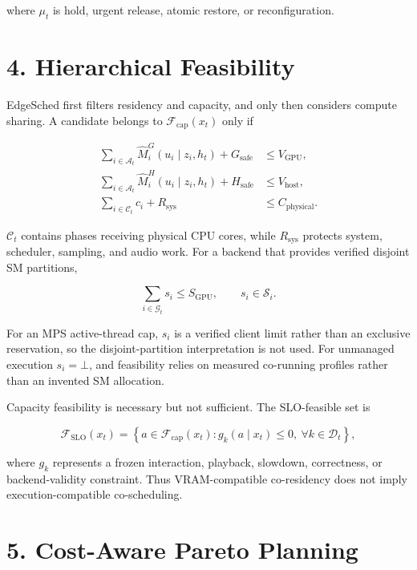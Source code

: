 \documentclass[10pt]{article}
\begin{document}
where $\mu_t$ is hold, urgent release, atomic restore, or reconfiguration.

\section*{4. Hierarchical Feasibility}

EdgeSched first filters residency and capacity, and only then considers compute
sharing.  A candidate belongs to $\mathcal F_{\mathrm{cap}}(x_t)$ only if

\begin{align}
\sum_{i\in\mathcal A_t}
  \widehat M_i^G(u_i\mid z_i,h_t)+G_{\mathrm{safe}}
  &\le V_{\mathrm{GPU}},\\
\sum_{i\in\mathcal A_t}
  \widehat M_i^H(u_i\mid z_i,h_t)+H_{\mathrm{safe}}
  &\le V_{\mathrm{host}},\\
\sum_{i\in\mathcal C_t}c_i+R_{\mathrm{sys}}
  &\le C_{\mathrm{physical}}.
\end{align}

$\mathcal C_t$ contains phases receiving physical CPU cores, while
$R_{\mathrm{sys}}$ protects system, scheduler, sampling, and audio work.  For a
backend that provides verified disjoint SM partitions,

\begin{equation}
\sum_{i\in\mathcal G_t}s_i\le S_{\mathrm{GPU}},
\qquad s_i\in\mathcal S_i .
\end{equation}

For an MPS active-thread cap, $s_i$ is a verified client limit rather than an
exclusive reservation, so the disjoint-partition interpretation is not used.
For unmanaged execution $s_i=\bot$, and feasibility relies on measured
co-running profiles rather than an invented SM allocation.

Capacity feasibility is necessary but not sufficient.  The SLO-feasible set is

\begin{equation}
\mathcal F_{\mathrm{SLO}}(x_t)=
\left\{a\in\mathcal F_{\mathrm{cap}}(x_t):
g_k(a\mid x_t)\le 0,\ \forall k\in\mathcal D_t\right\},
\end{equation}

where $g_k$ represents a frozen interaction, playback, slowdown, correctness,
or backend-validity constraint.  Thus VRAM-compatible co-residency does not
imply execution-compatible co-scheduling.

\section*{5. Cost-Aware Pareto Planning}
\end{document}

